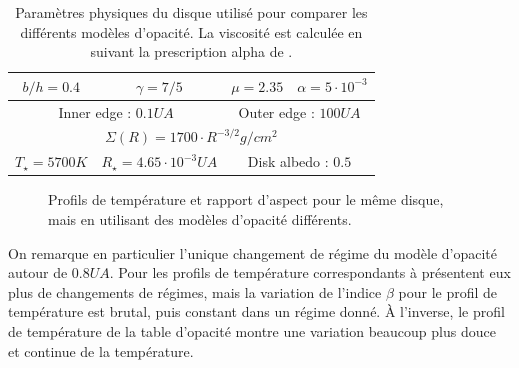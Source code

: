 \begin{table}[htbp]
\centering
\begin{tabular}{|c|c|c|c|}
\hline
$b/h = 0.4$ & $\gamma = 7/5$ & $\mu = 2.35$ & $\alpha = 5\cdot 10^{-3}$ \\\hline
\multicolumn{2}{|c|}{Inner edge : $0.1\unit{UA}$} & \multicolumn{2}{c|}{Outer edge : $100\unit{UA}$}\\\hline
\multicolumn{4}{|c|}{$\Sigma(R) = 1700 \cdot R^{-3/2}\unit{g/cm^2}$}\\\hline
$T_\star = 5700\unit{K}$ & $R_\star = 4.65\cdot 10^{-3}\unit{UA}$ & \multicolumn{2}{c|}{Disk albedo : $0.5$}\\\hline
\end{tabular}
\caption[Paramètres du disque utilisé pour comparer les différents modèles d'opacité.]{Paramètres physiques du disque utilisé
pour comparer les différents modèles d'opacité. La viscosité est calculée en suivant la prescription alpha de
\cite{shakura1973black}.}\label{tab:opacity_disk_parameters}
\end{table}

\begin{figure}[htbp]
\centering
{}\hfill
{}

\caption[Influence du modèle d'opacité sur la température et le rapport d'aspect.]{Profils de température et rapport d'aspect
pour le même disque, mais en utilisant des modèles d'opacité différents.}\label{fig:opacity_profiles}
\end{figure}

On remarque en particulier l'unique changement de régime du modèle d'opacité \cite{chambers2009analytic} autour de $0.8\unit{UA}$. Pour les profils de température correspondants à \cite{bell1994FU, zhu2009nonsteady} présentent eux plus de changements de régimes, mais la variation de l'indice $\beta$ pour le profil de température est brutal, puis constant dans un régime donné. À l'inverse, le profil de température de la table d'opacité \cite{hure2000transition} montre une variation beaucoup plus douce et continue de la température. 

